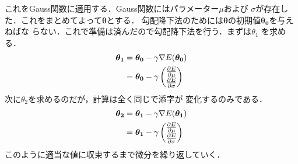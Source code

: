 \documentclass{jlreq}
\begin{document}
			これをGauss関数に適用する．Gauss関数にはパラメーター\(\mu\)および
			\(\sigma\)が存在した．これをまとめてよって\(\bm{\theta}\)とする．
			勾配降下法のためには\(\bm{\theta}\)の初期値\(\bm{\theta_0}\)を与えねばな
			らない．これで準備は済んだので勾配降下法を行う．まずは\(\theta_1\)
			を求める．
				\begin{align}
					\bm{\theta_1} &= \bm{\theta_0} - \gamma\nabla E(\bm{\theta_0})\\
					&= \bm{\theta_0}-\gamma
						\begin{pmatrix}
							\pdv{E}{\mu}\\
							\pdv{E}{\sigma}
						\end{pmatrix}
				\end{align}
			次に\(\theta_2\)を求めるのだが，計算は全く同じで添字が
			変化するのみである．
				\begin{align}
					\bm{\theta_2} &= \bm{\theta_1} - \gamma\nabla E(\bm{\theta_1})\\
					&= \bm{\theta_1}-\gamma
						\begin{pmatrix}
							\pdv{E}{\mu}\\
							\pdv{E}{\sigma}
						\end{pmatrix}
				\end{align}
			このように適当な値に収束するまで微分を繰り返していく．
\end{document}
